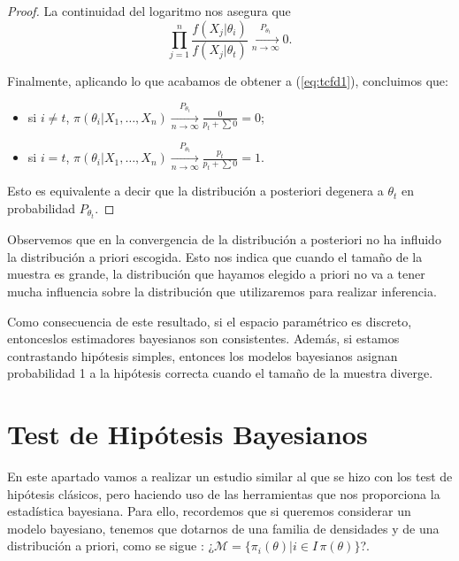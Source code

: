 \documentclass{article}
\begin{document}
\begin{proof}
	La continuidad del logaritmo nos asegura que
    \[\prod_{j=1}^n{\frac{f(X_j|\theta_i)}{f(X_j|\theta_t)}} \xrightarrow[n\to\infty]{P_{\theta_t}} 0.\]

	Finalmente, aplicando lo que acabamos de obtener a (\ref{eq:tcfd1}), concluimos que:

	\begin{itemize}
		\item si $i \ne t$, $\pi(\theta_i|X_1,\ldots,X_n) \xrightarrow[n\to\infty]{P_{\theta_t}} \frac{0}{p_t+\sum{0}} = 0$;
		\item si $i = t$, $\pi(\theta_i|X_1,\ldots,X_n) \xrightarrow[n\to\infty]{P_{\theta_t}} \frac{p_t}{p_t+\sum{0}} = 1$.
	\end{itemize}

	Esto es equivalente a decir que la distribución a posteriori degenera a $\theta_t$ en probabilidad $P_{\theta_t}$.
\end{proof}

\begin{remark}
	Observemos que en la convergencia de la distribución a posteriori no ha influido la distribución a priori escogida. Esto nos indica que cuando el tamaño de la muestra es grande, la distribución que hayamos elegido a priori no va a tener mucha influencia sobre la distribución que utilizaremos para realizar inferencia.
\end{remark}

\begin{remark}
    Como consecuencia de este resultado, si el espacio paramétrico es discreto, entonceslos estimadores bayesianos son consistentes. Además, si estamos contrastando hipótesis simples, entonces los modelos bayesianos asignan probabilidad 1 a la hipótesis correcta cuando el tamaño de la muestra diverge.
\end{remark}

\pagebreak

\section{Test de Hipótesis Bayesianos} \label{sec:bayes:hipotesis}

En este apartado vamos a realizar un estudio similar al que se hizo con los test de hipótesis clásicos, pero haciendo uso de las herramientas que nos proporciona la estadística bayesiana. Para ello, recordemos que si queremos considerar un modelo bayesiano, tenemos que dotarnos de una familia de densidades y de una distribución a priori, como se sigue : ¿$\mathcal{M} = \{\pi_i(\theta)|i\in I\, \pi(\theta)\}$?.
\end{document}

